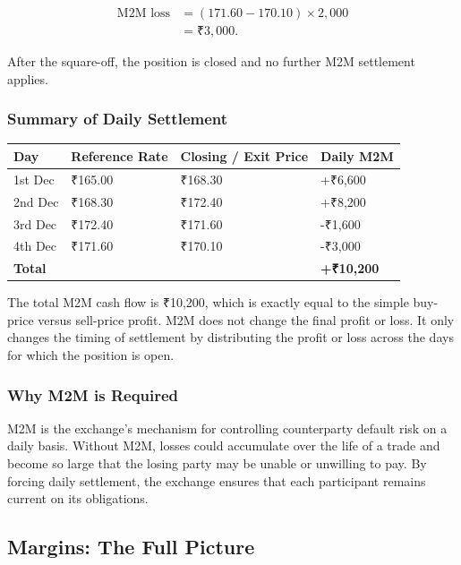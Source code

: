 \documentclass[12pt,openany]{book}
\begin{document}
\begin{align*}
\text{M2M loss} &= (171.60 - 170.10) \times 2{,}000 \\
&= \text{₹}3{,}000.
\end{align*}

After the square-off, the position is closed and no further M2M settlement applies.

\subsubsection{Summary of Daily Settlement}

\begin{center}
\small
\begin{tabular}{|L{0.20\textwidth}|L{0.22\textwidth}|L{0.24\textwidth}|L{0.22\textwidth}|}
\hline
\textbf{Day} & \textbf{Reference Rate} & \textbf{Closing / Exit Price} & \textbf{Daily M2M} \\ \hline
1st Dec & ₹165.00 & ₹168.30 & +₹6,600 \\ \hline
2nd Dec & ₹168.30 & ₹172.40 & +₹8,200 \\ \hline
3rd Dec & ₹172.40 & ₹171.60 & -₹1,600 \\ \hline
4th Dec & ₹171.60 & ₹170.10 & -₹3,000 \\ \hline
\textbf{Total} & & & \textbf{+₹10,200} \\ \hline
\end{tabular}
\end{center}

The total M2M cash flow is ₹10,200, which is exactly equal to the simple buy-price versus sell-price profit. M2M does not change the final profit or loss. It only changes the timing of settlement by distributing the profit or loss across the days for which the position is open.

\subsubsection{Why M2M is Required}
M2M is the exchange's mechanism for controlling counterparty default risk on a daily basis. Without M2M, losses could accumulate over the life of a trade and become so large that the losing party may be unable or unwilling to pay. By forcing daily settlement, the exchange ensures that each participant remains current on its obligations.

\subsection{Margins: The Full Picture}
\end{document}
